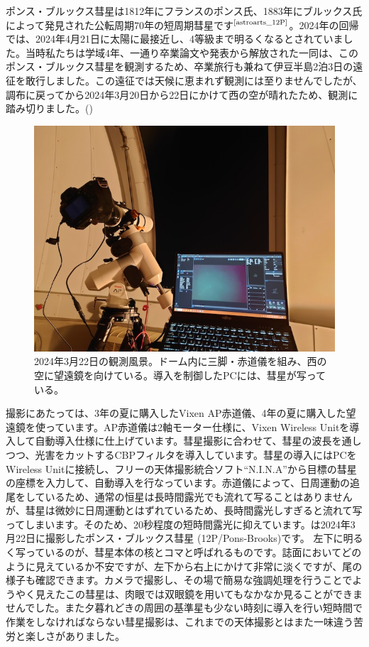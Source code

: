 \documentclass[../../super_nova_2024]{subfiles}
\begin{document}
ポンス・ブルックス彗星は1812年にフランスのポンス氏、1883年にブルックス氏によって発見された公転周期70年の短周期彗星です$^\text{\cite{astroarts_12P}}$。2024年の回帰では、2024年4月21日に太陽に最接近し、4等級まで明るくなるとされていました。当時私たちは学域4年、一通り卒業論文や発表から解放された一同は、このポンス・ブルックス彗星を観測するため、卒業旅行も兼ねて伊豆半島2泊3日の遠征を敢行しました。この遠征では天候に恵まれず観測には至りませんでしたが、調布に戻ってから2024年3月20日から22日にかけて西の空が晴れたため、観測に踏み切りました。()

\begin{figure}
    \centering
    \includegraphics[width=.8\columnwidth]{img/12P_shooting_image.JPG}
    \caption{2024年3月22日の観測風景。ドーム内に三脚・赤道儀を組み、西の空に望遠鏡を向けている。導入を制御したPCには、彗星が写っている。}
    \label{fig:Pons_Obs}
\end{figure}

撮影にあたっては、3年の夏に購入したVixen AP赤道儀、4年の夏に購入した望遠鏡を使っています。AP赤道儀は2軸モーター仕様に、Vixen Wireless Unitを導入して自動導入仕様に仕上げています。彗星撮影に合わせて、彗星の波長を通しつつ、光害をカットするCBPフィルタを導入しています。彗星の導入にはPCをWireless Unitに接続し、フリーの天体撮影統合ソフト``N.I.N.A''から目標の彗星の座標を入力して、自動導入を行なっています。赤道儀によって、日周運動の追尾をしているため、通常の恒星は長時間露光でも流れて写ることはありませんが、彗星は微妙に日周運動とはずれているため、長時間露光しすぎると流れて写ってしまいます。そのため、20秒程度の短時間露光に抑えています。は2024年3月22日に撮影したポンス・ブルックス彗星 (12P/Pons-Brooks)です。
左下に明るく写っているのが、彗星本体の核とコマと呼ばれるものです。誌面においてどのように見えているか不安ですが、左下から右上にかけて非常に淡くですが、尾の様子も確認できます。カメラで撮影し、その場で簡易な強調処理を行うことでようやく見えたこの彗星は、肉眼では双眼鏡を用いてもなかなか見ることができませんでした。また夕暮れどきの周囲の基準星も少ない時刻に導入を行い短時間で作業をしなければならない彗星撮影は、これまでの天体撮影とはまた一味違う苦労と楽しさがありました。
\end{document}
